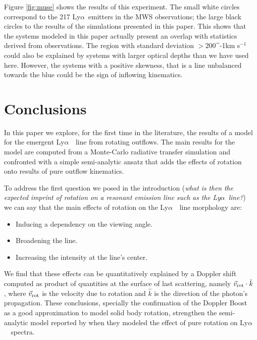 \documentclass[a4paper,fleqn,usenatbib]{mnras}
\newcommand{\lya}{\ifmmode{{\rm Ly}\alpha}\else Ly$\alpha$\ \fi}
\newcommand{\kms}{\ifmmode\mathrm{km\ s}^{-1}\else km s$^{-1}$\fi}
\begin{document}
Figure \ref{fig:muse} shows the results of this experiment. 
The small white circles correspond to the 217 \lya emitters in the MWS
observations; the large black circles to the results of the
simulations presented in this paper. 
This shows that the systems modeled in this paper actually present an
overlap with statistics derived from observations. 
The region with standard deviation $>200$\kms could also be explained
by systems with larger optical depths than we have used here. 
However, the systems with a positive skewness, that is a line
unbalanced towards the blue could be the sign of inflowing
kinematics. 

\section{Conclusions}
\label{sec:conclusions}

In this paper we explore, for the first time in the literature,
the results of a model for the emergent \lya\ line from rotating outflows.
The main results for the model are computed from a Monte-Carlo
radiative transfer simulation and confronted with a simple
semi-analytic ansatz that adds the effects of rotation onto results of
pure outflow kinematics. 

To address the first question we posed in the introduction (\emph{what is then
the expected imprint of rotation on a resonant emission line such as
the \lya line?}) we can say that the main effects of rotation on the
\lya\ line morphology are: 

\begin{itemize}
  \item Inducing a dependency on the viewing angle.
  \item Broadening the line.
  \item Increasing the intensity at the line's center.
\end{itemize}

We find that these effects can be quantitatively explained by a
Doppler shift computed as product of quantities at the surface of last
scattering, namely  $\vec{v}_{\rm rot}\cdot \hat{k}$,  where
$\vec{v}_{\rm rot}$ is the velocity due to rotation and $\hat{k}$ is
the direction of the photon's propagation.  
These conclusions, specially the confirmation of the Doppler Boost as
a good approximation to model solid body rotation, strengthen the
semi-analytic model reported by \cite{Garavito14} when they modeled
the effect of pure rotation on \lya\ spectra. 
\end{document}
